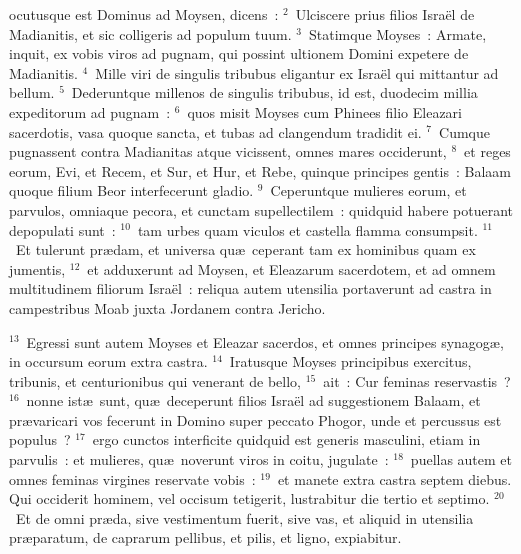 \bchapter
{}ocutusque est Dominus ad Moysen, dicens~:
${}^{2}$~Ulciscere prius filios Isra\"el de Madianitis, et sic colligeris ad populum tuum.
${}^{3}$~Statimque Moyses~: Armate, inquit, ex vobis viros ad pugnam, qui possint ultionem Domini expetere de Madianitis.
${}^{4}$~Mille viri de singulis tribubus eligantur ex Isra\"el qui mittantur ad bellum.
${}^{5}$~Dederuntque millenos de singulis tribubus, id est, duodecim millia expeditorum ad pugnam~:
${}^{6}$~quos misit Moyses cum Phinees filio Eleazari sacerdotis, vasa quoque sancta, et tubas ad clangendum tradidit ei.
${}^{7}$~Cumque pugnassent contra Madianitas atque vicissent, omnes mares occiderunt,
${}^{8}$~et reges eorum, Evi, et Recem, et Sur, et Hur, et Rebe, quinque principes gentis~: Balaam quoque filium Beor interfecerunt gladio.
${}^{9}$~Ceperuntque mulieres eorum, et parvulos, omniaque pecora, et cunctam supellectilem~: quidquid habere potuerant depopulati sunt~:
${}^{10}$~tam urbes quam viculos et castella flamma consumpsit.
${}^{11}$~Et tulerunt pr\ae dam, et universa qu\ae\ ceperant tam ex hominibus quam ex jumentis,
${}^{12}$~et adduxerunt ad Moysen, et Eleazarum sacerdotem, et ad omnem multitudinem filiorum Isra\"el~: reliqua autem utensilia portaverunt ad castra in campestribus Moab juxta Jordanem contra Jericho.


${}^{13}$~Egressi sunt autem Moyses et Eleazar sacerdos, et omnes principes synagog\ae , in occursum eorum extra castra.
${}^{14}$~Iratusque Moyses principibus exercitus, tribunis, et centurionibus qui venerant de bello,
${}^{15}$~ait~: Cur feminas reservastis~?
${}^{16}$~nonne ist\ae\ sunt, qu\ae\ deceperunt filios Isra\"el ad suggestionem Balaam, et pr\ae varicari vos fecerunt in Domino super peccato Phogor, unde et percussus est populus~?
${}^{17}$~ergo cunctos interficite quidquid est generis masculini, etiam in parvulis~: et mulieres, qu\ae\ noverunt viros in coitu, jugulate~:
${}^{18}$~puellas autem et omnes feminas virgines reservate vobis~:
${}^{19}$~et manete extra castra septem diebus. Qui occiderit hominem, vel occisum tetigerit, lustrabitur die tertio et septimo.
${}^{20}$~Et de omni pr\ae da, sive vestimentum fuerit, sive vas, et aliquid in utensilia pr\ae paratum, de caprarum pellibus, et pilis, et ligno, expiabitur.


